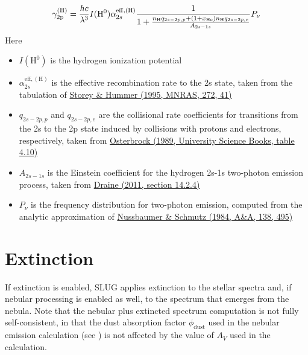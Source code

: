 \documentclass[letterpaper,10pt,english]{sphinxmanual}
\begin{document}
\begin{gather}
\begin{split}\gamma_{\mathrm{2p}}^{(\mathrm{H})} = \frac{hc}{\lambda^3} I(\mathrm{H}^0) \alpha_{2s}^{\mathrm{eff,(H)}} \frac{1}{1 + \frac{n_{\mathrm{H}} q_{2s-2p,p} + (1+x_{\mathrm{He}}) n_{\mathrm{H}} q_{2s-2p,e}}{A_{2s-1s}}} P_\nu\end{split}\notag
\end{gather}
Here
\begin{itemize}
\item {} 
\(I(\mathrm{H}^0)\) is the hydrogen ionization potential

\item {} 
\(\alpha_{2s}^{\mathrm{eff,(H)}}\) is the effective recombination rate to the 2s state, taken from the tabulation of \href{http://adsabs.harvard.edu/abs/1995MNRAS.272...41S}{Storey \& Hummer (1995, MNRAS, 272, 41)}

\item {} 
\(q_{2s-2p,p}\) and \(q_{2s-2p,e}\) are the collisional rate coefficients for transitions from the 2s to the 2p state induced by collisions with protons and electrons, respectively, taken from \href{http://adsabs.harvard.edu/abs/1989agna.book.....O}{Osterbrock (1989, University Science Books, table 4.10)}

\item {} 
\(A_{2s-1s}\) is the Einstein coefficient for the hydrogen 2s-1s two-photon emission process, taken from \href{http://adsabs.harvard.edu/abs/2011piim.book.....D}{Draine (2011, section 14.2.4)}

\item {} 
\(P_\nu\) is the frequency distribution for two-photon emission, computed from the analytic approximation of \href{http://adsabs.harvard.edu/abs/1984A\%26A...138..495N}{Nussbaumer \& Schmutz (1984, A\&A, 138, 495)}

\end{itemize}


\section{Extinction}
\label{intro:extinction}\label{intro:ssec-extinction}
If extinction is enabled, SLUG applies extinction to the stellar spectra and, if nebular processing is enabled as well, to the spectrum that emerges from the nebula. Note that the nebular plus extincted spectrum computation is not fully self-consistent, in that the dust absorption factor \(\phi_{\mathrm{dust}}\) used in the nebular emission calculation (see {\hyperref[intro:ssec-nebula]{\emph{}}}) is not affected by the value of \(A_V\) used in the calculation.
\end{document}
